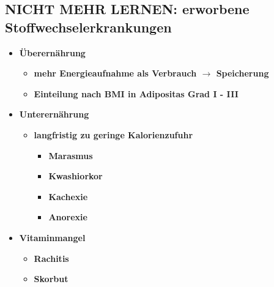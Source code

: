 \subsection{NICHT MEHR LERNEN: erworbene Stoffwechselerkrankungen}
	\begin{itemize}
		\item \textbf{Überernährung}
			\begin{itemize}
				\item \textbf{mehr Energieaufnahme als Verbrauch $\rightarrow$ Speicherung}
				\item \textbf{Einteilung nach BMI in Adipositas Grad I - III}
			\end{itemize}
		\item \textbf{Unterernährung}
			\begin{itemize}
				\item \textbf{langfristig zu geringe Kalorienzufuhr}
					\begin{itemize}
						\item \textbf{Marasmus}
						\item \textbf{Kwashiorkor}
						\item \textbf{Kachexie}
						\item \textbf{Anorexie}
					\end{itemize}
			\end{itemize}
		\item \textbf{Vitaminmangel}
			\begin{itemize}
				\item \textbf{Rachitis}
				\item \textbf{Skorbut}
			\end{itemize}
	\end{itemize}